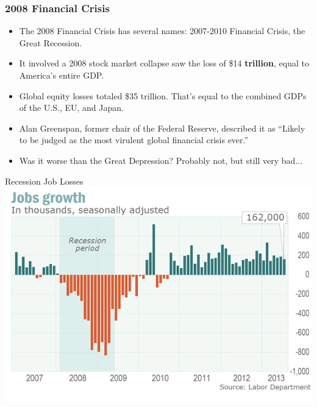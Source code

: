 \documentclass[handout]{beamer}
\begin{document}
\begin{frame} 
	\frametitle{\LARGE{2008 Financial Crisis}}
	\begin{itemize}
		\item The 2008 Financial Crisis has several names: 2007-2010 Financial Crisis, the Great Recession. \pause
		\item It involved a 2008 stock market collapse saw the loss of \$14 \textbf{trillion}, equal to America's entire GDP. \pause
		\item Global equity losses totaled \$35 trillion. That's equal to the combined GDPs of the U.S., EU, and Japan. \pause
		\item Alan Greenspan, former chair of the Federal Reserve, described it as “Likely to be judged as the most virulent global financial crisis ever.” \pause
		\item Was it worse than the Great Depression? Probably not, but still very bad...	
	\end{itemize}
\end{frame}


\begin{frame}{\LARGE Recession Job Losses}
	\centering
	\includegraphics[width=\textwidth,height=.8\textheight,keepaspectratio]{jobgrowth.png}
\end{frame}
\end{document}
